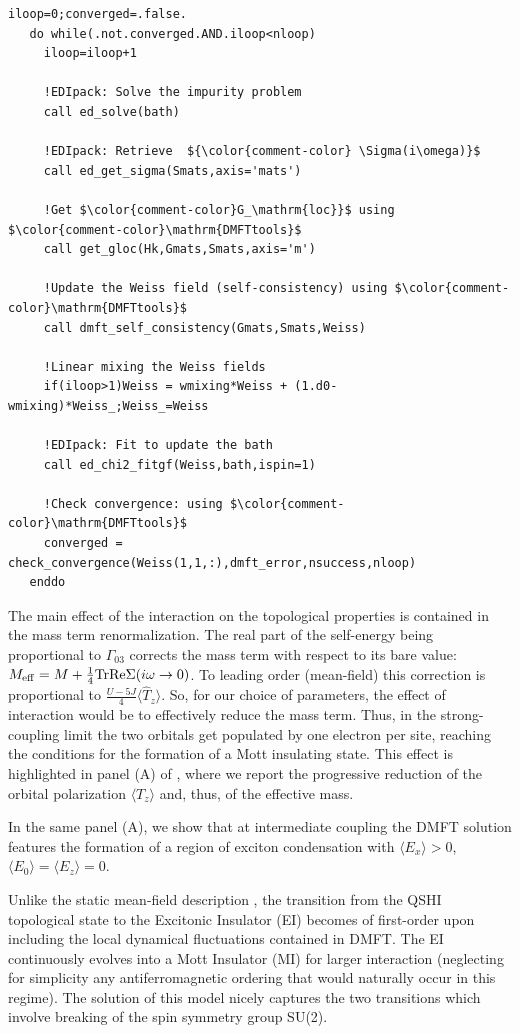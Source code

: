 \documentclass[edipack_sp.tex]{subfiles}
\begin{document}
\begin{lstlisting}[style=fstyle,numbers=none,basicstyle={\scriptsize\ttfamily}]
   iloop=0;converged=.false.
   do while(.not.converged.AND.iloop<nloop)
     iloop=iloop+1
     
     !EDIpack: Solve the impurity problem
     call ed_solve(bath)

     !EDIpack: Retrieve  ${\color{comment-color} \Sigma(i\omega)}$
     call ed_get_sigma(Smats,axis='mats')
     
     !Get $\color{comment-color}G_\mathrm{loc}}$ using $\color{comment-color}\mathrm{DMFTtools}$
     call get_gloc(Hk,Gmats,Smats,axis='m')
     
     !Update the Weiss field (self-consistency) using $\color{comment-color}\mathrm{DMFTtools}$
     call dmft_self_consistency(Gmats,Smats,Weiss)

     !Linear mixing the Weiss fields
     if(iloop>1)Weiss = wmixing*Weiss + (1.d0-wmixing)*Weiss_;Weiss_=Weiss

     !EDIpack: Fit to update the bath
     call ed_chi2_fitgf(Weiss,bath,ispin=1)
     
     !Check convergence: using $\color{comment-color}\mathrm{DMFTtools}$
     converged = check_convergence(Weiss(1,1,:),dmft_error,nsuccess,nloop)
   enddo  
\end{lstlisting}

%
The main effect of the interaction on the topological properties is contained in the mass term renormalization.  
The real part of the self-energy being proportional to $\Gamma_{03}$
corrects the mass term with respect to its bare value: $M_\mathrm{eff}=M+\tfrac{1}{4}{\rm Tr}{{\rm Re}\Sigma(i\omega\to0)}$. 
To leading order (mean-field) this correction is proportional to $\tfrac{U-5J}{4}\langle
\hat{T}_z\rangle$. So, for our choice of parameters, the effect of
interaction would be to effectively reduce the mass term. Thus, in the strong-coupling limit the two orbitals get populated by one electron per site, reaching the
conditions for the formation of a Mott insulating state.
This effect is highlighted in panel (A) of , where we report the progressive reduction of the
orbital polarization  $\langle T_z\rangle$ and, thus, of the effective mass. 


In the same panel (A), we show that at intermediate coupling 
the DMFT solution features the formation of a
region of exciton condensation with $\langle E_x\rangle>0$, $\langle
E_0\rangle=\langle E_z\rangle=0$. 

Unlike the static mean-field description \cite{Blason}, the
transition from the QSHI topological state to the Excitonic Insulator 
(EI) becomes of first-order upon including the local dynamical fluctuations \cite{Paoletti2024PR,BellomiaKMH} contained in DMFT. 
The EI continuously evolves into a Mott Insulator (MI)
for larger interaction (neglecting for simplicity any 
antiferromagnetic ordering that would naturally occur in this
regime).
The \NAME solution of this model nicely captures the two transitions which involve breaking of the spin symmetry group SU(2). 
\end{document}
